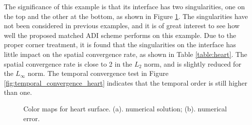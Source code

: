 \documentclass[dissertation]{uathesis}
\begin{document}
\begin{body}
\begin{flushleft}
\hspace{1cm} The significance of this example is that its interface has two singularities, one on the top and the other at the bottom, as shown in Figure \ref{fig:color_map_heart}. The singularities have not been considered in previous examples, and it is of great interest to see how well the proposed matched ADI scheme performs on this example. 
Due to the proper corner treatment, it is found that the singularities on the interface has little impact on the spatial convergence rate, as shown in Table \ref{table:heart}. 
The spatial convergence rate is close to 2 in the $L_2$ norm, and is slightly reduced 
for the $L_{\infty}$ norm. 
The temporal convergence test in Figure \ref{fig:temporal_convergence_heart}  indicates that the temporal  order is still higher than one. 
%
\begin{figure}[!ht]	
	\begin{center}
	\end{center}
	\caption{Color maps for heart surface. (a). numerical solution; (b). numerical error.}
	\label{fig:color_map_heart}
\end{figure}
%



\end{flushleft}
\end{body}
\end{document}
